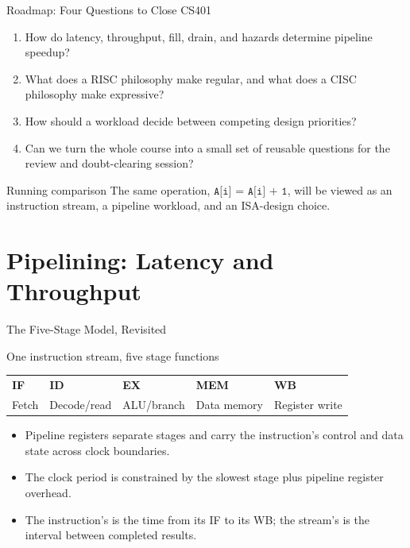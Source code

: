 \documentclass[aspectratio=169]{beamer}
\begin{document}
\begin{frame}{Roadmap: Four Questions to Close CS401}
  \begin{enumerate}
    \item How do latency, throughput, fill, drain, and hazards determine
      pipeline speedup?
    \item What does a RISC philosophy make regular, and what does a CISC
      philosophy make expressive?
    \item How should a workload decide between competing design priorities?
    \item Can we turn the whole course into a small set of reusable questions
      for the review and doubt-clearing session?
  \end{enumerate}
  \vspace{0.15cm}
  \begin{alertblock}{Running comparison}
    The same operation, $\texttt{A[i] = A[i] + 1}$, will be viewed as an
    instruction stream, a pipeline workload, and an ISA-design choice.
  \end{alertblock}
\end{frame}


\section{Pipelining: Latency and Throughput}

\begin{frame}{The Five-Stage Model, Revisited}
  \begin{block}{One instruction stream, five stage functions}
    \begin{tabular}{@{}lllll@{}}
      \textbf{IF} & \textbf{ID} & \textbf{EX} & \textbf{MEM} & \textbf{WB}\\
      Fetch & Decode/read & ALU/branch & Data memory & Register write
    \end{tabular}
  \end{block}
  \begin{itemize}
    \item Pipeline registers separate stages and carry the instruction's
      control and data state across clock boundaries.
    \item The clock period is constrained by the slowest stage plus pipeline
      register overhead.
    \item The instruction's  is the time from its IF to its WB;
      the stream's  is the interval between completed results.
  \end{itemize}
\end{frame}
\end{document}
